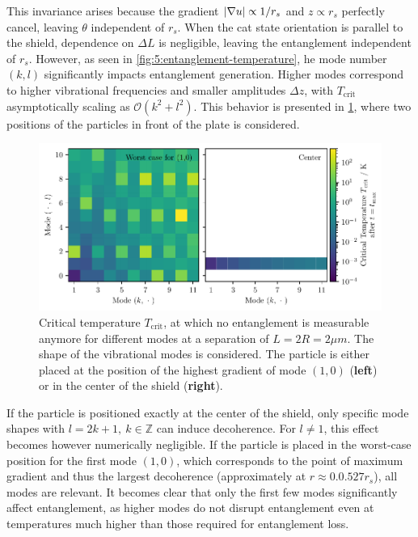 This invariance arises because the gradient $\left\lvert\nabla u\right\rvert \propto 1/r_s$ and $z \propto r_s$ perfectly cancel, leaving $\theta$ independent of $r_s$. 
When the cat state orientation is parallel to the shield, dependence on $\Delta L$ is negligible, leaving the entanglement independent of $r_s$.
However, as seen in \cref{fig:5:entanglement-temperature}, he mode number $(k, l)$ significantly impacts entanglement generation.
Higher modes correspond to higher vibrational frequencies and smaller amplitudes $\Delta z$, with $T_\mathrm{crit}$ asymptotically scaling as $\mathcal{O}(k^2 + l^2)$. 
This behavior is presented in \cref{fig:5:T-crit-modes}, where two positions of the particles in front of the plate is considered.
\begin{figure}[!htbp]
  \centering
  \includegraphics[width=\textwidth]{./../figures/vibrations/T-crit-modes.pdf}
  \caption{Critical temperature $T_\mathrm{crit}$, at which no entanglement is measurable anymore for different modes at a separation of $L = 2R = 2\si{\mu m}$. The shape of the vibrational modes is considered. The particle is either placed at the position of the highest gradient of mode $(1,0)$ (\textbf{left}) or in the center of the shield (\textbf{right}).}
  \label{fig:5:T-crit-modes}
\end{figure}
If the particle is positioned exactly at the center of the shield, only specific mode shapes with $l=2k+1,\ k\in\mathbb{Z}$ can induce decoherence.
For $l \neq 1$, this effect becomes however numerically negligible.
If the particle is placed in the worst-case position for the first mode $(1,0)$, which corresponds to the point of maximum gradient and thus the largest decoherence  (approximately at $r \approx 0.0.527 r_s$), all modes are relevant.
It becomes clear that only the first few modes significantly affect entanglement, as higher modes do not disrupt entanglement even at temperatures much higher than those required for entanglement loss.

